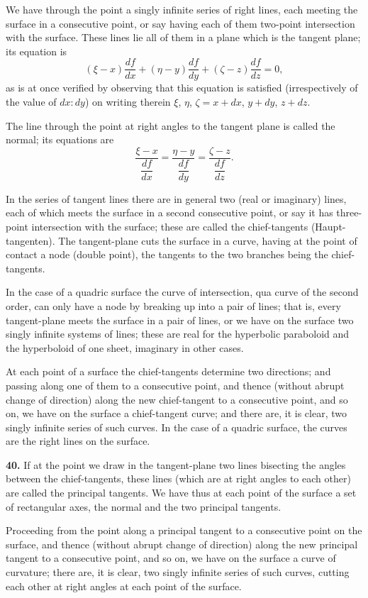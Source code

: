 \documentclass[11pt,a4paper]{book}
\begin{document}
We have through the point a singly infinite series of right lines, each meeting the surface in a consecutive point, or say having each of them two-point intersection with the surface. These lines lie all of them in a plane which is the tangent plane; its equation is
\[
(\xi - x)\frac{df}{dx} + (\eta - y)\frac{df}{dy} + (\zeta - z)\frac{df}{dz} = 0,
\]
as is at once verified by observing that this equation is satisfied (irrespectively of the value of $dx : dy$) on writing therein $\xi$, $\eta$, $\zeta = x + dx$, $y + dy$, $z + dz$.

The line through the point at right angles to the tangent plane is called the normal; its equations are
\[
\frac{\xi - x}{\dfrac{df}{dx}} = \frac{\eta - y}{\dfrac{df}{dy}} = \frac{\zeta - z}{\dfrac{df}{dz}}.
\]

In the series of tangent lines there are in general two (real or imaginary) lines, each of which meets the surface in a second consecutive point, or say it has three-point intersection with the surface; these are called the chief-tangents (Haupt-tangenten). The tangent-plane cuts the surface in a curve, having at the point of contact a node (double point), the tangents to the two branches being the chief-tangents.

In the case of a quadric surface the curve of intersection, qua curve of the second order, can only have a node by breaking up into a pair of lines; that is, every tangent-plane meets the surface in a pair of lines, or we have on the surface two singly infinite systems of lines; these are real for the hyperbolic paraboloid and the hyperboloid of one sheet, imaginary in other cases.

At each point of a surface the chief-tangents determine two directions; and passing along one of them to a consecutive point, and thence (without abrupt change of direction) along the new chief-tangent to a consecutive point, and so on, we have on the surface a chief-tangent curve; and there are, it is clear, two singly infinite series of such curves. In the case of a quadric surface, the curves are the right lines on the surface.

\textbf{40.}\quad
If at the point we draw in the tangent-plane two lines bisecting the angles between the chief-tangents, these lines (which are at right angles to each other) are called the principal tangents. We have thus at each point of the surface a set of rectangular axes, the normal and the two principal tangents.

Proceeding from the point along a principal tangent to a consecutive point on the surface, and thence (without abrupt change of direction) along the new principal tangent to a consecutive point, and so on, we have on the surface a curve of curvature; there are, it is clear, two singly infinite series of such curves, cutting each other at right angles at each point of the surface.
\end{document}
